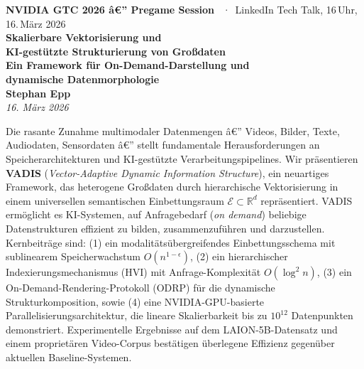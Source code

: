 ﻿\documentclass[12pt,a4paper]{article}
\begin{document}
\begin{center}
  \vspace*{0.2cm}
  {\small\textcolor{nvidiaGreen}{\textbf{NVIDIA GTC 2026 â€” Pregame Session}} \, ·\,
   LinkedIn Tech Talk, 16\,Uhr, 16.\,März 2026}\\[0.5em]

  {\LARGE\bfseries\color{nvidiaDark}
   Skalierbare Vektorisierung und \\KI-gestützte Strukturierung von Großdaten}\\[0.3em]
  {\Large\bfseries\color{accentBlue}
   Ein Framework für On-Demand-Darstellung und\\[0.1em]
   dynamische Datenmorphologie}\\[0.7em]

  {\normalsize\bfseries Stephan Epp}\\[0.4em]
  {\small\textit{16. März 2026}}\\[0.8em]

  \begin{minipage}{0.88\linewidth}
    \begin{tcolorbox}[mybox, title={Abstract}]
      \small
      Die rasante Zunahme multimodaler Datenmengen â€” Videos, Bilder, Texte, 
      Audiodaten, Sensordaten â€” stellt fundamentale Herausforderungen an 
      Speicherarchitekturen und KI-gestützte Verarbeitungspipelines.
      Wir präsentieren \textbf{VADIS} (\textit{Vector-Adaptive Dynamic 
      Information Structure}), ein neuartiges Framework, das heterogene 
      Großdaten durch hierarchische Vektorisierung in einem universellen 
      semantischen Einbettungsraum $\mathcal{E} \subset \mathbb{R}^d$ 
      repräsentiert. VADIS ermöglicht es KI-Systemen, auf Anfragebedarf 
      (\textit{on demand}) beliebige Datenstrukturen effizient zu bilden, 
      zusammenzuführen und darzustellen. Kernbeiträge sind: (1) ein 
      modalitätsübergreifendes Einbettungsschema mit sublinearem 
      Speicherwachstum $O(n^{1-\epsilon})$, (2) ein hierarchischer 
      Indexierungsmechanismus (HVI) mit Anfrage-Komplexität 
      $O(\log^2 n)$, (3) ein On-Demand-Rendering-Protokoll (ODRP) für 
      die dynamische Strukturkomposition, sowie (4) eine NVIDIA-GPU-basierte 
      Parallelisierungsarchitektur, die lineare Skalierbarkeit bis zu 
      $10^{12}$ Datenpunkten demonstriert. Experimentelle Ergebnisse auf 
      dem LAION-5B-Datensatz und einem proprietären Video-Corpus 
      bestätigen überlegene Effizienz gegenüber aktuellen Baseline-Systemen.
    \end{tcolorbox}
  \end{minipage}\\[0.9em]
\end{center}
\end{document}
